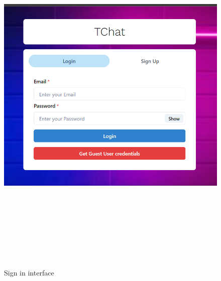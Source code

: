 \begin{figure}[H]
	\centering
	\includegraphics[width=160mm, height=180mm]{images/signin.png}
	\caption{Sign in interface} %
	\label{figusecase} %
\end{figure}
